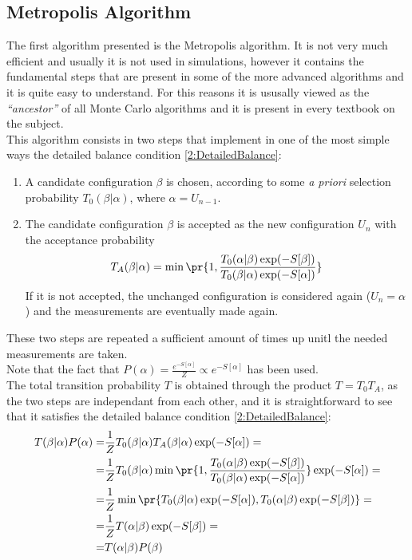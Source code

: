 \subsection{Metropolis Algorithm}
The first algorithm presented is the Metropolis algorithm. It is not very much efficient and usually it is not used in simulations, however it contains the fundamental steps that are present in some of the more advanced algorithms and it is quite easy to understand.
For this reasons it is ususally viewed as the \emph{``ancestor''} of all Monte Carlo algorithms and it is present in every textbook on the subject.\\
This algorithm consists in two steps that implement in one of the most simple ways the detailed balance condition \eqref{2:DetailedBalance}:
\begin{enumerate}[label=\arabic*)]
    \item A candidate configuration $\beta$ is chosen, according to some \emph{a priori} selection probability $T_0(\beta|\alpha)$, where $\alpha=U_{n-1}$.
    \item The candidate configuration $\beta$ is accepted as the new configuration $U_n$ with the acceptance probability
          \begin{equation}
              T_A(\beta|\alpha) = \min\pr{1,\frac{T_0(\alpha|\beta)\exp(-S[\beta])}{T_0(\beta|\alpha)\exp(-S[\alpha])}} \label{2:MetropolisAccProb}
          \end{equation}
          If it is not accepted, the unchanged configuration is considered again ($U_n=\alpha$) and the measurements are eventually made again.
\end{enumerate}
These two steps are repeated a sufficient amount of times up unitl the needed measurements are taken.\\
Note that the fact that $P(\alpha) = \frac{e^{-S[\alpha]}}{Z} \varpropto e^{-S[\alpha]}$ has been used.\\
The total transition probability $T$ is obtained through the product $T=T_0T_A$, as the two steps are independant from each other, and it is straightforward to see that it satisfies the detailed balance condition \eqref{2:DetailedBalance}:
\begin{align*}
    T(\beta|\alpha)P(\alpha) =& \frac1Z T_0(\beta|\alpha)T_A(\beta|\alpha)\exp(-S[\alpha]) = \\
    =& \frac1Z T_0(\beta|\alpha)\min\pr{1,\frac{T_0(\alpha|\beta)\exp(-S[\beta])}{T_0(\beta|\alpha)\exp(-S[\alpha])}}\exp(-S[\alpha]) = \\
    =& \frac1Z \min\pr{T_0(\beta|\alpha)\exp(-S[\alpha]), T_0(\alpha|\beta)\exp(-S[\beta])} = \\
    =& \frac1Z T(\alpha|\beta)\exp(-S[\beta]) = \\
    =& T(\alpha|\beta)P(\beta)
\end{align*}
